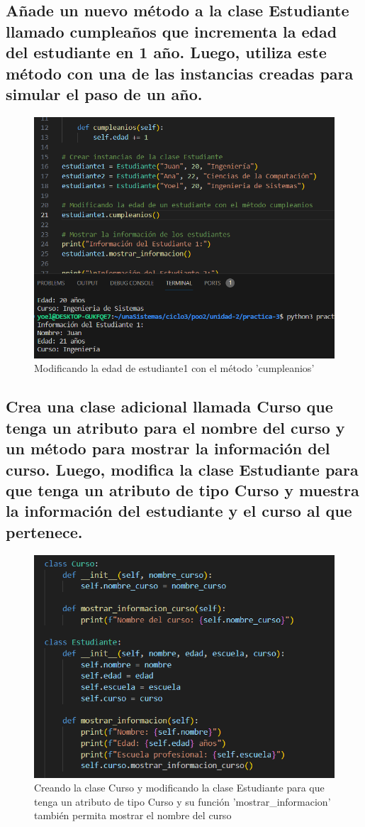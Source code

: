\documentclass[11pt,a4paper]{article}
\begin{document}
\subsection{Añade un nuevo método a la clase Estudiante llamado cumpleaños que incrementa la edad del estudiante en 1 año. Luego, utiliza este método con una de las instancias creadas para simular el paso de un año.}

\begin{figure}[H]
    \centering
    \includegraphics[width=0.6\linewidth]{images/3.png}
    \caption{Modificando la edad de estudiante1 con el método 'cumpleanios'}
    \label{fig:enter-label}
\end{figure}

\subsection{Crea una clase adicional llamada Curso que tenga un atributo para el nombre del curso y un método para mostrar la información del curso. Luego, modifica la clase Estudiante para que tenga un atributo de tipo Curso y muestra la información del estudiante y el curso al que pertenece.}

\begin{figure}[H]
    \centering
    \includegraphics[width=0.6\linewidth]{images/4.png}
    \caption{Creando la clase Curso y modificando la clase Estudiante para que tenga un atributo de tipo Curso y su función 'mostrar\_informacion' también permita mostrar el nombre del curso}
    \label{fig:enter-label}
\end{figure}
\end{document}

